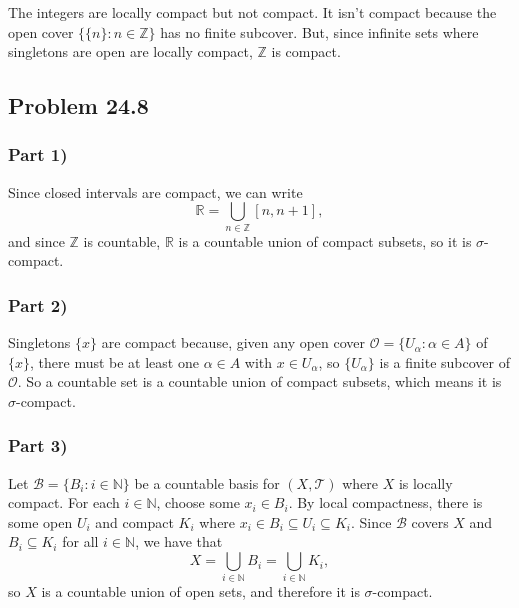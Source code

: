 \documentclass{article}
\newcommand{\R}{\mathbb{R}}
\newcommand{\N}{\mathbb{N}}
\newcommand{\Z}{\mathbb{Z}}
\newcommand{\T}{\mathcal{T}}
\newcommand{\B}{\mathcal{B}}
\newcommand{\mcO}{\mathcal{O}}
\begin{document}
The integers are locally compact but not compact. It isn't compact because the open cover $\{\{n\}: n \in \Z\}$ has no finite subcover. But, since infinite sets where singletons are open are locally compact, $\Z$ is compact.

\subsection*{Problem 24.8}
\subsubsection*{Part 1)}
Since closed intervals are compact, we can write
$$\R = \bigcup_{n \in \Z} [n, n + 1],$$
and since $\Z$ is countable, $\R$ is a countable union of compact subsets, so it is $\sigma$-compact.

\subsubsection*{Part 2)}
Singletons $\{x\}$ are compact because, given any open cover $\mcO = \{U_\alpha : \alpha \in A\}$ of $\{x\}$, there must be at least one $\alpha \in A$ with $x \in U_\alpha$, so $\{U_\alpha\}$ is a finite subcover of $\mcO$. So a countable set is a countable union of compact subsets, which means it is $\sigma$-compact.

\subsubsection*{Part 3)}
Let $\B = \{B_i: i \in \N\}$ be a countable basis for $(X, \T)$ where $X$ is locally compact. For each $i \in \N$, choose some $x_i \in B_i$. By local compactness, there is some open $U_i$ and compact $K_i$ where $x_i \in B_i \subseteq U_i \subseteq K_i$. Since $\B$ covers $X$ and $B_i \subseteq K_i$ for all $i \in \N$, we have that
$$X = \bigcup_{i \in \N} B_i = \bigcup_{i \in \N} K_i,$$
so $X$ is a countable union of open sets, and therefore it is $\sigma$-compact.
\end{document}
